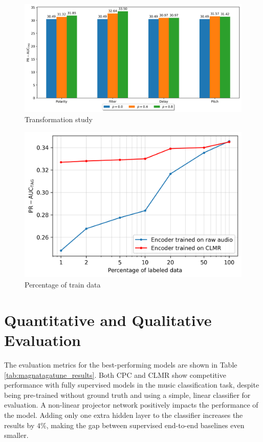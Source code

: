 \begin{figure}[t]
    \centering
    \includegraphics[width=\columnwidth]{figs/transformation_probabilities.png}
    \caption{Transformation study}
    \label{fig:transformation_probabilities}
\end{figure}


\begin{figure}[t]
    \centering
    \includegraphics[width=\columnwidth]{figs/perc_train_data.png}
    \caption{Percentage of train data}
    \label{fig:perc_train_data}
\end{figure}


\section{Quantitative and Qualitative Evaluation}
The evaluation metrics for the best-performing models are shown in Table \ref{tab:magnatagatune_results}. Both CPC and CLMR show competitive performance with fully supervised models in the music classification task, despite being pre-trained without ground truth and using a simple, linear classifier for evaluation. A non-linear projector network positively impacts the performance of the model. Adding only one extra hidden layer to the classifier increases the results by $4\%$, making the gap between supervised end-to-end baselines even smaller.

